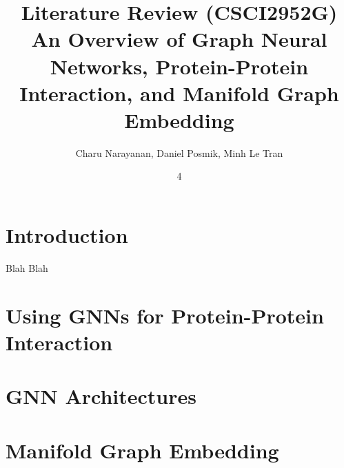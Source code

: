 \documentclass[twoside,11pt]{article}
\begin{document}
\title{	Literature Review (CSCI2952G) \\
\vspace{.1in}
An Overview of Graph Neural Networks, Protein-Protein Interaction, and Manifold Graph Embedding 	
}

\author{Charu Narayanan, Daniel Posmik, Minh Le Tran}

\maketitle
\date{4 }

\section{Introduction} \label{sec:intro}

Blah Blah 

\section{Using GNNs for Protein-Protein Interaction} \label{sec:application}

\citet{jha_etal_2022}

\section{GNN Architectures} \label{sec:architecture}

\section{Manifold Graph Embedding} \label{sec:manifold}
\end{document}
